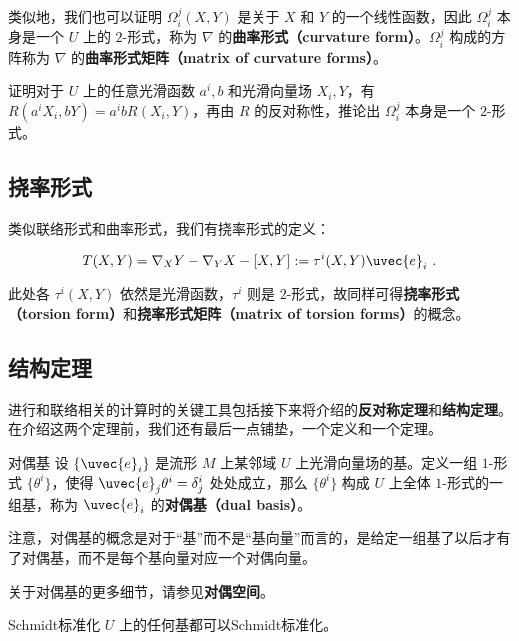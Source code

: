 类似地，我们也可以证明 $\Omega^j_i(X, Y)$ 是关于 $X$ 和 $Y$ 的一个线性函数，因此 $\Omega^j_i$ 本身是一个 $U$ 上的 $2$-形式，称为 $\nabla$ 的\textbf{曲率形式（curvature form）}。$\Omega^j_i$ 构成的方阵称为 $\nabla$ 的\textbf{曲率形式矩阵（matrix of curvature forms）}。

\begin{exercise}{}
证明对于 $U$ 上的任意光滑函数 $a^i, b$ 和光滑向量场 $X_i, Y$，有 $R(a^iX_i, bY)=a^ibR(X_i, Y)$，再由 $R$ 的反对称性，推论出 $\Omega^j_i$ 本身是一个 $2$-形式。
\end{exercise}

\subsection{挠率形式}


类似联络形式和曲率形式，我们有挠率形式的定义：

\begin{equation}
T(X, Y)=\nabla_XY-\nabla_YX-[X, Y]:=\tau^i(X, Y)\uvec{e}_i~.
\end{equation}

此处各 $\tau^i(X, Y)$ 依然是光滑函数，$\tau^i$ 则是 $2$-形式，故同样可得\textbf{挠率形式（torsion form）}和\textbf{挠率形式矩阵（matrix of torsion forms）}的概念。





\subsection{结构定理}

进行和联络相关的计算时的关键工具包括接下来将介绍的\textbf{反对称定理}和\textbf{结构定理}。在介绍这两个定理前，我们还有最后一点铺垫，一个定义和一个定理。


\begin{definition}{对偶基}
设 $\{\uvec{e}_i\}$ 是流形 $M$ 上某邻域 $U$ 上光滑向量场的基。定义一组 $1$-形式 $\{\theta^i\}$，使得 $\uvec{e}_j\theta^i=\delta^i_j$ 处处成立，那么 $\{\theta^i\}$ 构成 $U$ 上全体 $1$-形式的一组基，称为 $\uvec{e}_i$ 的\textbf{对偶基（dual basis）}。
\end{definition}


注意，对偶基的概念是对于“基”而不是“基向量”而言的，是给定一组基了以后才有了对偶基，而不是每个基向量对应一个对偶向量。

关于对偶基的更多细节，请参见\textbf{对偶空间}。


\begin{theorem}{Schmidt标准化}
$U$ 上的任何基都可以Schmidt标准化。
\end{theorem}

